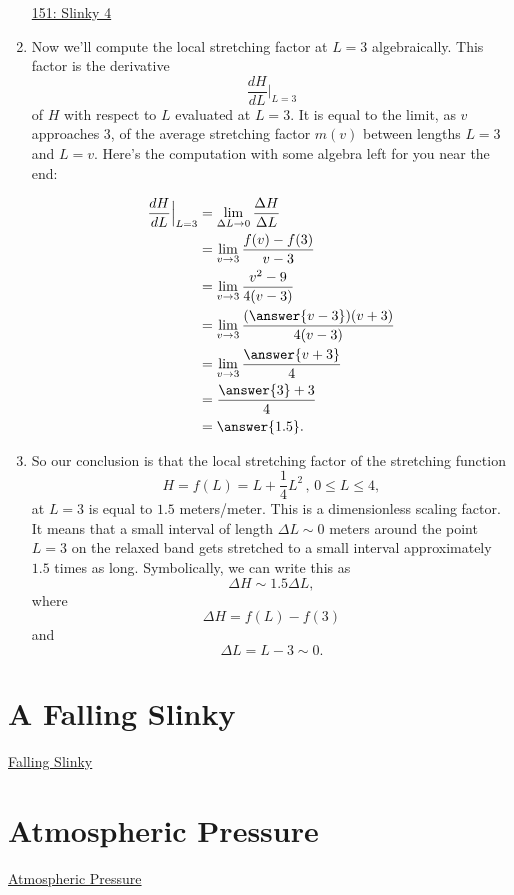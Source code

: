 \documentclass{ximera}
\begin{document}
\begin{example}
\begin{enumerate}
\href{https://www.desmos.com/calculator/zsbupxubm6}{151: Slinky 4}


\item Now we'll compute the local stretching factor at $L=3$ algebraically. This factor is the derivative
\[
  \frac{dH}{dL}\Big|_{L=3} 
\]
of $H$ with respect to $L$ evaluated at $L=3$. It is equal to the limit, as $v$ approaches $3$, of the average stretching factor $m(v)$ between lengths $L=3$ and $L=v$. Here's the computation with some algebra left for you near the end:

\begin{align*}
  \frac{dH}{dL}\Big|_{L=3} &= \lim_{\Delta L \to 0} \frac{\Delta H}{\Delta L} \\
              &= \lim_{v\to 3}\frac{f(v) - f(3)}{v-3} \\
              &= \lim_{v\to 3}\frac{v^2-9}{4(v-3)}   \\
              &= \lim_{v\to 3} \frac{(\answer{v-3})(v+3)}{4(v-3)} \\
              &=  \lim_{v\to 3} \frac{\answer{v+3}}{4} \\
              &= \frac{\answer{3}+3}{4}  \\
              &= \answer{1.5} .
\end{align*}

\item So our conclusion is that the local stretching factor of the stretching function
\[
      H = f(L) = L + \frac{1}{4}L^2 \, , \, 0\leq L \leq 4,
\]
at $L=3$ is equal to $1.5$ meters/meter. This is a dimensionless scaling factor. It means that a small interval of length $\Delta L\sim 0$ meters around the point $L=3$ on the relaxed band gets stretched to a small interval approximately $1.5$ times as long. Symbolically, we can write this as
\[
          \Delta H \sim 1.5\Delta L,
\]
where
\[
   \Delta H = f(L) - f(3)
\]
and 
\[
    \Delta L = L - 3 \sim 0 .
\]
\end{enumerate}


\end{example}

\section{A Falling Slinky}

\href{https://www.youtube.com/watch?v=eCMmmEEyOO0}{Falling Slinky}


\section{Atmospheric Pressure}

\href{https://projects.iq.harvard.edu/files/acmg/files/intro_atmo_chem_bookchap2.pdf}{Atmospheric Pressure} 
\end{document}
